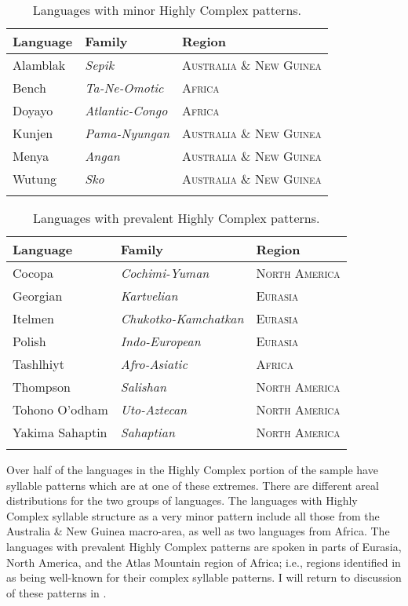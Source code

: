 \begin{table}
\begin{tabular}{lll}
\lsptoprule
{Language} & {Family} & {Region}\\\midrule
Alamblak & \textit{Sepik} & \textsc{Australia \& New Guinea}\\
Bench & \textit{Ta-Ne-Omotic} & \textsc{Africa}\\
Doyayo & \textit{Atlantic-Congo} & \textsc{Africa}\\
Kunjen & \textit{Pama-Nyungan} & \textsc{Australia \& New Guinea}\\
Menya & \textit{Angan} & \textsc{Australia \& New Guinea}\\
Wutung & \textit{Sko}  & \textsc{Australia \& New Guinea}\\
\lspbottomrule
\end{tabular}
\caption{\label{tab:3.15}Languages with minor Highly Complex patterns.}
\end{table}


\begin{table}
\begin{tabular}{lll}
\lsptoprule
{Language} & {Family} & {Region}\\\midrule
Cocopa & \textit{Cochimi-Yuman} & \textsc{North America}\\
Georgian & \textit{Kartvelian} & \textsc{Eurasia}\\
Itelmen & \textit{Chukotko-Kamchatkan} & \textsc{Eurasia}\\
Polish & \textit{Indo-European} & \textsc{Eurasia}\\
Tashlhiyt & \textit{Afro-Asiatic} & \textsc{Africa}\\
Thompson & \textit{Salishan} & \textsc{North America}\\
Tohono O’odham & \textit{Uto-Aztecan} & \textsc{North America}\\
Yakima Sahaptin & \textit{Sahaptian} & \textsc{North America}\\
\lspbottomrule
\end{tabular}
\caption{\label{tab:3.16}Languages with prevalent Highly Complex patterns.}
\end{table}

  Over half of the languages in the Highly Complex portion of the sample have syllable patterns which are at one of these extremes. There are different areal distributions for the two groups of languages. The languages with Highly Complex syllable structure as a very minor pattern include all those from the Australia \& New Guinea macro-area, as well as two languages from Africa. The languages with prevalent Highly Complex patterns are spoken in parts of Eurasia, North America, and the Atlas Mountain region of Africa; i.e., regions identified in  as being well-known for their complex syllable patterns. I will return to discussion of these patterns in .

